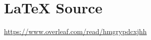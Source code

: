 \documentclass{article}
\theoremstyle{definition}
\begin{document}
\section*{\LaTeX \hspace{0.10 mm} Source}
\url{https://www.overleaf.com/read/hmgrypdcxjhh}
%
%
%


%
%
\end{document}
